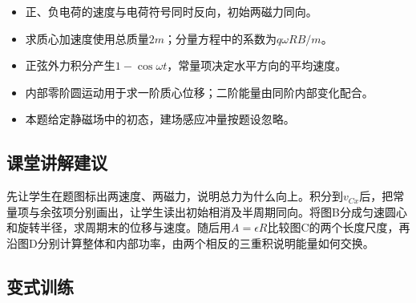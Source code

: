 \documentclass[UTF8,fontset=fandol,a4paper,11pt]{ctexart}
\begin{document}
\begin{itemize}
\item 正、负电荷的速度与电荷符号同时反向，初始两磁力同向。
\item 求质心加速度使用总质量$2m$；分量方程中的系数为$q\omega RB/m$。
\item 正弦外力积分产生$1-\cos\omega t$，常量项决定水平方向的平均速度。
\item 内部零阶圆运动用于求一阶质心位移；二阶能量由同阶内部变化配合。
\item 本题给定静磁场中的初态，建场感应冲量按题设忽略。
\end{itemize}



\subsection*{课堂讲解建议}

先让学生在题图标出两速度、两磁力，说明总力为什么向上。积分到$v_{Cx}$后，把常量项与余弦项分别画出，让学生读出初始相消及半周期同向。将图B分成匀速圆心和旋转半径，求周期末的位移与速度。随后用$A=\epsilon R$比较图C的两个长度尺度，再沿图D分别计算整体和内部功率，由两个相反的三重积说明能量如何交换。



\subsection*{变式训练}
\end{document}
